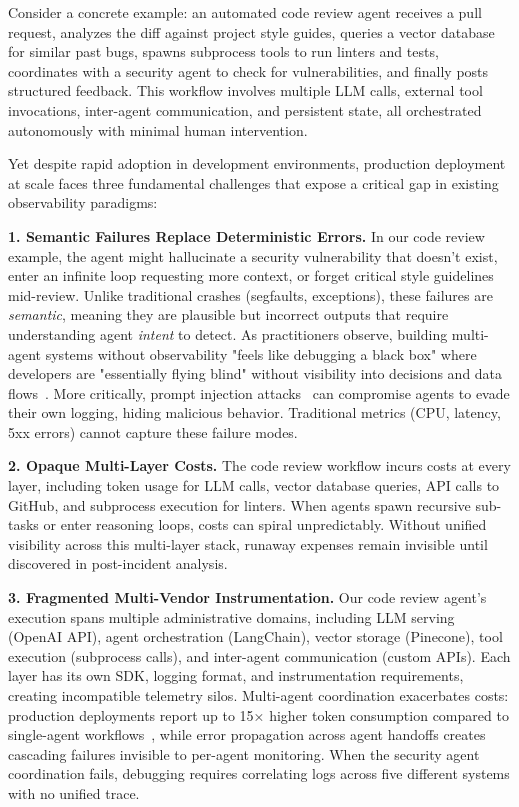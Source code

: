 \documentclass[sigplan,screen,9pt]{acmart}
\begin{document}
Consider a concrete example: an automated code review agent receives a pull request, analyzes the diff against project style guides, queries a vector database for similar past bugs, spawns subprocess tools to run linters and tests, coordinates with a security agent to check for vulnerabilities, and finally posts structured feedback. This workflow involves multiple LLM calls, external tool invocations, inter-agent communication, and persistent state, all orchestrated autonomously with minimal human intervention.

Yet despite rapid adoption in development environments, production deployment at scale faces three fundamental challenges that expose a critical gap in existing observability paradigms:

\textbf{1. Semantic Failures Replace Deterministic Errors.} In our code review example, the agent might hallucinate a security vulnerability that doesn't exist, enter an infinite loop requesting more context, or forget critical style guidelines mid-review. Unlike traditional crashes (segfaults, exceptions), these failures are \emph{semantic}, meaning they are plausible but incorrect outputs that require understanding agent \emph{intent} to detect. As practitioners observe, building multi-agent systems without observability "feels like debugging a black box" where developers are "essentially flying blind" without visibility into decisions and data flows~\cite{petropavlov-medium,masood-medium}. More critically, prompt injection attacks~\cite{indirect-prompt-inject} can compromise agents to evade their own logging, hiding malicious behavior. Traditional metrics (CPU, latency, 5xx errors) cannot capture these failure modes.

\textbf{2. Opaque Multi-Layer Costs.} The code review workflow incurs costs at every layer, including token usage for LLM calls, vector database queries, API calls to GitHub, and subprocess execution for linters. When agents spawn recursive sub-tasks or enter reasoning loops, costs can spiral unpredictably. Without unified visibility across this multi-layer stack, runaway expenses remain invisible until discovered in post-incident analysis.

\textbf{3. Fragmented Multi-Vendor Instrumentation.} Our code review agent's execution spans multiple administrative domains, including LLM serving (OpenAI API), agent orchestration (LangChain), vector storage (Pinecone), tool execution (subprocess calls), and inter-agent communication (custom APIs). Each layer has its own SDK, logging format, and instrumentation requirements, creating incompatible telemetry silos. Multi-agent coordination exacerbates costs: production deployments report up to 15× higher token consumption compared to single-agent workflows~\cite{anthropic-multiagent}, while error propagation across agent handoffs creates cascading failures invisible to per-agent monitoring. When the security agent coordination fails, debugging requires correlating logs across five different systems with no unified trace.
\end{document}
